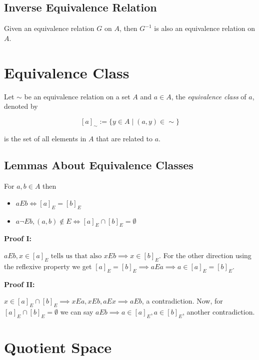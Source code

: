 \subsection{Inverse Equivalence Relation}

Given an equivalence relation \(G\) on \(A\), then \(G^{-1}\) is also an equivalence relation on \(A\).

\section{Equivalence Class}

Let \(\sim\) be an equivalence relation on a set \(A\) and \(a \in A\), the 
\emph{equivalence class} of \(a\), denoted by 

\[
	[a]_{\sim} := \{y \in A \mid (a,y) \in \sim\}
\] 

is the set of all elements in \(A\) that are related to \(a\).

\subsection{Lemmas About Equivalence Classes}

For \(a,b \in A\) then 

\begin{itemize}

	\item \(aEb \iff [a]_E = [b]_E\)

	\item \(a \neg E b, (a,b) \notin E \iff [a]_E \cap [b]_E = \emptyset \)

\end{itemize}

\textbf{Proof I:}

\(aEb, x \in [a]_E \text{ tells us that also } x E b \implies x \in [b]_E \). For the other direction 
using the reflexive property we get \([a]_E = [b]_E \implies a E a \implies a \in [a]_E = [b]_E\).

\QED

\textbf{Proof II:}

\(x \in [a]_E \cap [b]_E \implies x E a, x E b, a E x \implies a E b\), a contradiction. 
Now, for \( [a]_E \cap [b]_E = \emptyset\) we can say \(a E b \implies a \in [a]_E, a \in [b]_E \), another contradiction.

\QED 

\section{Quotient Space}

